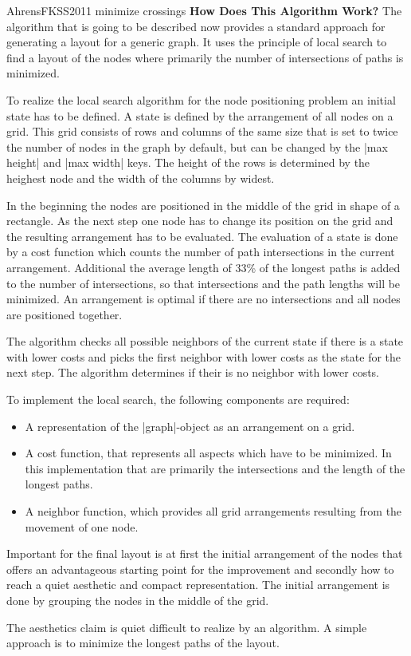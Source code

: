 \begin{gdalgorithm}{AhrensFKSS2011 minimize crossings}
  \medskip
  \noindent\textbf{How Does This Algorithm Work?}
  The algorithm that is going to be described now provides a standard
  approach for generating a layout for a generic graph. It uses the
  principle of local search to find a layout of the nodes where
  primarily the number of intersections of paths is minimized.
  
  To realize the local search algorithm for the node positioning problem an
  initial state has to be defined. A state is defined by the arrangement
  of all nodes on a grid. This grid consists of rows and columns of the
  same size that is set to twice the number of nodes in the graph by
  default, but can be changed by the |max height| and |max width|
  keys. The height of the rows is determined by the heighest node and
  the width of the columns by widest.
  
  In the beginning the nodes are positioned in the middle of the grid in
  shape of a rectangle. As the next step one node has to change its
  position on the grid and the resulting arrangement has to be
  evaluated. The evaluation of a state is done by a cost function which
  counts the number of path intersections in the current
  arrangement. Additional the average length of 33\% of the longest
  paths is added to the number of intersections, so that intersections
  and the path lengths will be minimized. An arrangement is optimal if
  there are no intersections and all nodes are positioned together.
  
  The algorithm checks all possible neighbors of the current state if
  there is a state with lower costs and picks the first neighbor with
  lower costs as the state for the next step. The algorithm determines
  if their is no neighbor with lower costs. 
  
  To implement the local search, the following components are required:
  \begin{itemize}
  \item A representation of the |graph|-object as an arrangement on a
    grid.
  \item A cost function, that represents all aspects which have to be
    minimized. In this implementation that are primarily the
    intersections and the length of the longest paths. 
  \item A neighbor function, which provides all grid arrangements
    resulting from the movement of one node.
  \end{itemize}
  Important for the final layout is at first the initial arrangement of
  the nodes that offers an advantageous starting point for the
  improvement and secondly how to reach a quiet aesthetic and compact
  representation. The initial arrangement is done by grouping the nodes
  in the middle of the grid.
  
  The aesthetics claim is quiet difficult to realize by an algorithm. A
  simple approach is to minimize the longest paths of the layout. 
\end{gdalgorithm}




